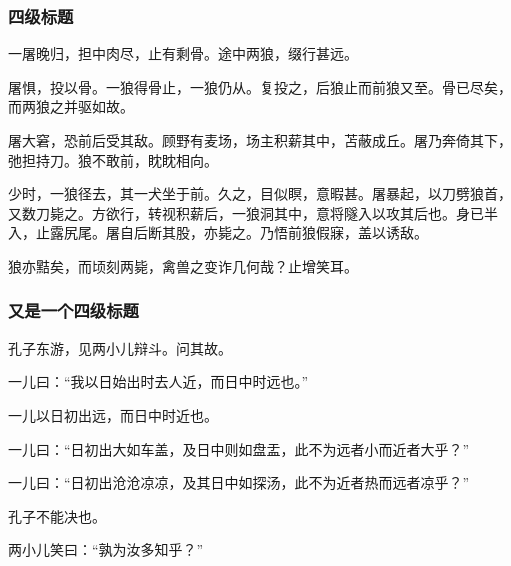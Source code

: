             \subsubsection{四级标题}

                一屠晚归，担中肉尽，止有剩骨。途中两狼，缀行甚远。

                屠惧，投以骨。一狼得骨止，一狼仍从。复投之，后狼止而前狼又至。骨已尽矣，而两狼之并驱如故。

                屠大窘，恐前后受其敌。顾野有麦场，场主积薪其中，苫蔽成丘。屠乃奔倚其下，弛担持刀。狼不敢前，眈眈相向。

                少时，一狼径去，其一犬坐于前。久之，目似瞑，意暇甚。屠暴起，以刀劈狼首，又数刀毙之。方欲行，转视积薪后，一狼洞其中，意将隧入以攻其后也。身已半入，止露尻尾。屠自后断其股，亦毙之。乃悟前狼假寐，盖以诱敌。

                狼亦黠矣，而顷刻两毙，禽兽之变诈几何哉？止增笑耳。

            \subsubsection{又是一个四级标题}

                孔子东游，见两小儿辩斗。问其故。

                一儿曰：“我以日始出时去人近，而日中时远也。”

                一儿以日初出远，而日中时近也。

                一儿曰：“日初出大如车盖，及日中则如盘盂，此不为远者小而近者大乎？”

                一儿曰：“日初出沧沧凉凉，及其日中如探汤，此不为近者热而远者凉乎？”

                孔子不能决也。

                两小儿笑曰：“孰为汝多知乎？”

